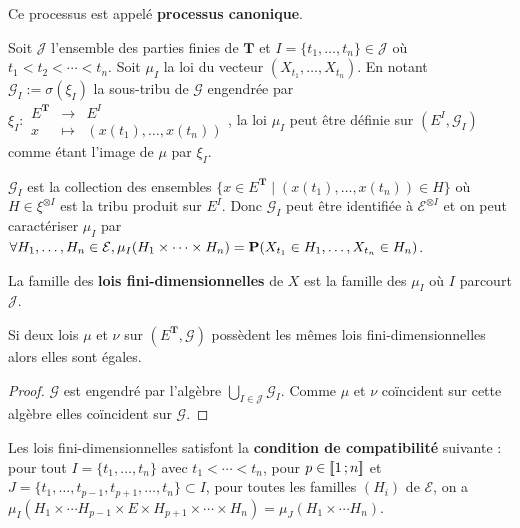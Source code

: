	Ce processus est appelé \textbf{processus canonique}.
	
	\begin{defn}
		Soit $\mathcal{J}$ l'ensemble des parties finies de $\mathbf{T}$ et $I = \{ t_1,\ldots,t_n \} \in \mathcal{J}$ où $t_1 < t_2 < \cdots < t_n$.
		Soit $\mu_I$ la loi du vecteur $(X_{t_1},\ldots,X_{t_n})$.
		En notant $\mathcal{G}_I := \sigma(\xi_I)$ la sous-tribu de $\mathcal{G}$ engendrée par $\xi_I \colon \begin{array}{lcl} E^{\mathbf{T}} & \to & E^I \\ x & \mapsto & (x(t_1),\ldots,x(t_n)) \end{array}$, la loi $\mu_I$ peut être définie sur $(E^I, \mathcal{G}_I)$ comme étant l'image de $\mu$ par $\xi_I$.
	\end{defn}
	
	\begin{rem}
		$\mathcal{G}_I$ est la collection des ensembles $\{ x \in E^{\mathbf{T}} \mid (x(t_1),\ldots,x(t_n)) \in H \}$ où $H \in \xi^{\otimes I}$ est la tribu produit sur $E^I$.
		Donc $\mathcal{G}_I$ peut être identifiée à $\mathcal{E}^{\otimes I}$ et on peut caractériser $\mu_I$ par $\forall H_1,\ldots,H_n \in \mathcal{E}, \mu_I(H_1 \times \cdots \times H_n) = \mathbf{P}(X_{t_1} \in H_1, \ldots, X_{t_n} \in H_n)$.
	\end{rem}
	
	\begin{defn}
		La famille des \textbf{lois fini-dimensionnelles} de $X$ est la famille des $\mu_I$ où $I$ parcourt $\mathcal{J}$.
	\end{defn}
	
	\begin{pop}
		Si deux lois $\mu$ et $\nu$ sur $\left( E^{\mathbf{T}}, \mathcal{G} \right)$ possèdent les mêmes lois fini-dimensionnelles alors elles sont égales.
	\end{pop}
	
	\begin{proof}
		$\mathcal{G}$ est engendré par l'algèbre $\bigcup_{I \in \mathcal{J}} \mathcal{G}_I$.
		Comme $\mu$ et $\nu$ coïncident sur cette algèbre elles coïncident sur $\mathcal{G}$.
	\end{proof}
	
	\begin{pop}
		Les lois fini-dimensionnelles satisfont la \textbf{condition de compatibilité} suivante : pour tout $I = \{ t_1,\ldots,t_n \}$ avec $t_1 < \cdots < t_n$, pour $p \in \mathopen{[\![}1\mathclose{}\mathpunct{};n\mathclose{]\!]}$ et $J = \{ t_1,\ldots,t_{p - 1},t_{p + 1},\ldots,t_n \} \subset I$, pour toutes les familles  $(H_i)$ de $\mathcal{E}$, on a $\mu_I(H_1 \times \cdots H_{p - 1} \times E \times H_{p + 1} \times \cdots \times H_n) = \mu_J(H_1 \times \cdots H_n)$.
	\end{pop}
	
